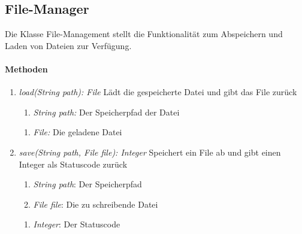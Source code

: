 \subsection*{File-Manager}\label{fileman}
Die Klasse File-Management stellt die Funktionalität zum Abspeichern und Laden von Dateien zur Verfügung.

\paragraph{Methoden}

\begin{enumerate}[+]
	\item \textit{load(String path): File} Lädt die gespeicherte Datei und gibt das File zurück
	\begin{enumerate}[$\bullet$]
	\item \textit{String path:} Der Speicherpfad der Datei
	\end{enumerate}
	\begin{enumerate}[$\circ$]
		\item \textit{File:} Die geladene Datei
	\end{enumerate}

	\item \textit{save(String path, File file): Integer} Speichert ein File ab und gibt einen Integer als Statuscode zurück
	\begin{enumerate}[$\bullet$]
		\item \textit{String path}: Der Speicherpfad
		\item \textit{File file}: Die zu schreibende Datei
	\end{enumerate}
	\begin{enumerate}[$\circ$]
	\item \textit{Integer}: Der Statuscode
	\end{enumerate}
\end{enumerate}
